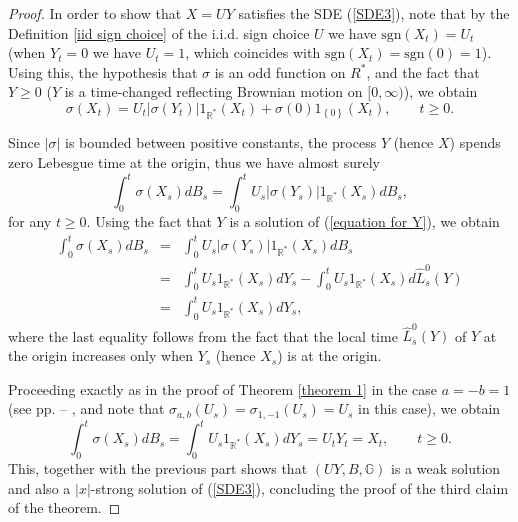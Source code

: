 \documentclass[reqno]{amsart}
\theoremstyle{definition}
\theoremstyle{remark}
\numberwithin{equation}{section}
\begin{document}
\begin{proof}
In order to show that $X=UY$ satisfies the SDE (\ref{SDE3}), note that by the Definition \ref{iid sign choice} of the i.i.d. sign choice $U$ we have $\mathrm{sgn}\left( X_{t}\right) =U_t$ (when $Y_t=0$ we have $U_t=1$, which coincides with $\mathrm{sgn}(X_t)=\mathrm{sgn}(0)=1$). Using this, the hypothesis that $\sigma $ is an odd function on $R^{\ast}$, and the fact that $Y\geq 0$ ($Y$ is a time-changed reflecting Brownian motion on $[0,\infty )$), we obtain
\[
\sigma \left( X_{t}\right) =U_{t}\left\vert \sigma \left( Y_{t}\right)
\right\vert 1_{\mathbb{R}^{\ast }}\left( X_{t}\right) +\sigma \left(
0\right) 1_{\left\{ 0\right\} }\left( X_{t}\right) ,\qquad t\geq 0.
\]

Since $\left\vert \sigma \right\vert $ is bounded between positive
constants, the process $Y$ (hence $X$) spends zero Lebesgue time at the
origin, thus we have almost surely\[
\int_{0}^{t}\sigma \left( X_{s}\right)
dB_{s}=\int_{0}^{t}U_{s}\left\vert \sigma \left( Y_{s}\right) \right\vert
1_{\mathbb{R}^{\ast }}\left( X_{s}\right) dB_{s},
\]for any $t\geq 0$. Using the fact that $Y$ is a solution of (\ref{equation for Y}), we obtain\begin{eqnarray*}
\int_{0}^{t}\sigma \left( X_{s}\right) dB_{s} &=&\int_{0}^{t}U_{s}\left\vert
\sigma \left( Y_{s}\right) \right\vert 1_{\mathbb{R}^{\ast }}\left( X_{s}\right)
dB_{s} \\
&=&\int_{0}^{t}U_{s}1_{\mathbb{R}^{\ast }}\left( X_{s}\right)
dY_{s}-\int_{0}^{t}U_{s}1_{\mathbb{R}^{\ast }}\left( X_{s}\right) d\widehat{L}_{s}^{0}\left(
Y\right) \\
&=&\int_{0}^{t}U_{s}1_{\mathbb{R}^{\ast }}\left( X_{s}\right) dY_{s},
\end{eqnarray*}where the last equality follows from the fact that the local time $\widehat{L}_{s}^{0}\left(
Y\right) $ of $Y$ at the origin increases only when $Y_{s}$ (hence $X_{s} $) is at the origin.

Proceeding exactly as in the proof of Theorem \ref{theorem 1} in the case $a=-b=1$
(see pp. \pageref{pagina de start referinta} -- \pageref{pagina de sfarsit referinta}, and note that $\sigma _{a,b}(U_{s})=\sigma _{1,-1}(U_{s})=U_{s}$ in this case), we obtain\[
\int_{0}^{t}\sigma \left( X_{s}\right) dB_{s}=\int_{0}^{t}U_{s}1_{\mathbb{R}^{\ast }}\left( X_{s}\right) dY_{s}=U_{t}Y_{t}=X_{t}, \qquad t\ge 0.
\]
This, together with the previous part shows that $(UY,B,\mathbb{G})$ is a weak solution and also a $\vert x\vert$-strong solution of (\ref{SDE3}), concluding the proof of the third claim of the theorem.


\end{proof}
\end{document}
